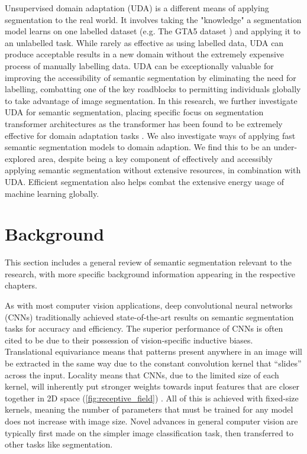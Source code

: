 \documentclass[a4paper,12pt]{report}
\begin{document}
Unsupervised domain adaptation (UDA) is a different means of applying segmentation to the real world. It involves taking the "knowledge" a segmentation model learns on one labelled dataset (e.g. The GTA5 dataset \cite{richter_playing_2016}) and applying it to an unlabelled task. While rarely as effective as using labelled data, UDA can produce acceptable results in a new domain without the extremely expensive process of manually labelling data. UDA can be exceptionally valuable for improving the accessibility of semantic segmentation by eliminating the need for labelling, combatting one of the key roadblocks to permitting individuals globally to take advantage of image segmentation. In this research, we further investigate UDA for semantic segmentation, placing specific focus on segmentation transformer architectures as the transformer has been found to be extremely effective for domain adaptation tasks \cite{yang_tvt_2021} \cite{xu_cdtrans_2021} \cite{hoyer_daformer_2022}. We also investigate ways of applying fast semantic segmentation models to domain adaption. We find this to be an under-explored area, despite being a key component of effectively and accessibly applying semantic segmentation without extensive resources, in combination with UDA. Efficient segmentation also helps combat the extensive energy usage of machine learning globally.


\section{Background}
This section includes a general review of semantic segmentation relevant to the research, with more specific background information appearing in the respective chapters.

As with most computer vision applications, deep convolutional neural networks (CNNs) traditionally achieved state-of-the-art results on semantic segmentation tasks for accuracy and efficiency. The superior performance of CNNs is often cited to be due to their possession of vision-specific inductive biases. Translational equivariance means that patterns present anywhere in an image will be extracted in the same way due to the constant convolution kernel that “slides” across the input. Locality means that CNNs, due to the limited size of each kernel, will inherently put stronger weights towards input features that are closer together in 2D space (\autoref{fig:receptive_field}) \cite{zhang_dive_2019}. All of this is achieved with fixed-size kernels, meaning the number of parameters that must be trained for any model does not increase with image size. Novel advances in general computer vision are typically first made on the simpler image classification task, then transferred to other tasks like segmentation.
\end{document}

